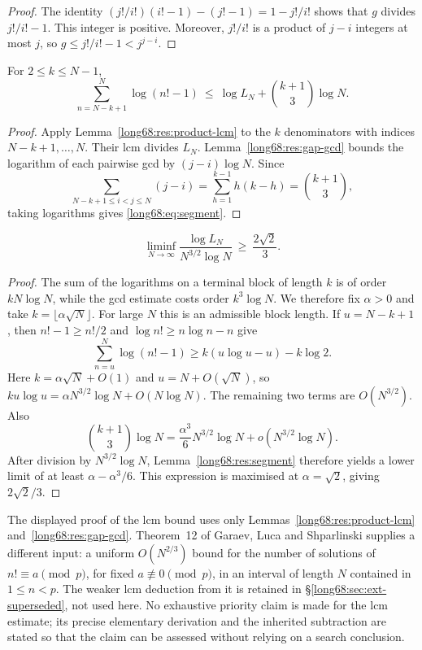\documentclass[11pt]{article}
\newcommand{\Lc}{L}
\begin{document}
\begin{proof}
The identity
$(j!/i!)(i!-1)-(j!-1)=1-j!/i!$ shows that $g$ divides $j!/i!-1$.
This integer is positive. Moreover, $j!/i!$ is a product of $j-i$ integers
at most $j$, so $g\le j!/i!-1<j^{j-i}$.
\end{proof}

\begin{lemma}\label{long68:res:segment}
For $2\le k\le N-1$,
\begin{equation}\label{long68:eq:segment}
 \sum_{n=N-k+1}^{N}\log(n!-1)
 \ \le\ \log \Lc_N+\binom{k+1}{3}\log N.
\end{equation}


\end{lemma}

\begin{proof}
Apply Lemma~\ref{long68:res:product-lcm} to the $k$ denominators with
indices $N-k+1,\ldots,N$. Their lcm divides $\Lc_N$.
Lemma~\ref{long68:res:gap-gcd} bounds the logarithm of each pairwise gcd
by $(j-i)\log N$. Since
\[
 \sum_{N-k+1\le i<j\le N}(j-i)
 =\sum_{h=1}^{k-1}h(k-h)=\binom{k+1}{3},
\]
taking logarithms gives \eqref{long68:eq:segment}.
\end{proof}

\begin{theorem}\label{long68:res:lcm-growth}
\[
 \liminf_{N\to\infty}\frac{\log \Lc_N}{N^{3/2}\log N}
 \ \ge\ \frac{2\sqrt2}{3}.
\]
\end{theorem}

\begin{proof}
The sum of the logarithms on a terminal block of length $k$ is of order
$kN\log N$, while the gcd estimate costs order $k^3\log N$.
We therefore fix $\alpha>0$ and take $k=\lfloor\alpha\sqrt N\rfloor$.
For large $N$ this is an admissible block length. If $u=N-k+1$, then
$n!-1\ge n!/2$ and $\log n!\ge n\log n-n$ give
\[
 \sum_{n=u}^N\log(n!-1)\ge k(u\log u-u)-k\log2.
\]
Here $k=\alpha\sqrt N+O(1)$ and $u=N+O(\sqrt N)$, so
$ku\log u=\alpha N^{3/2}\log N+O(N\log N)$.
The remaining two terms are $O(N^{3/2})$. Also
\[
 \binom{k+1}{3}\log N
 =\frac{\alpha^3}{6}N^{3/2}\log N+o(N^{3/2}\log N).
\]
After division by $N^{3/2}\log N$, Lemma~\ref{long68:res:segment}
therefore yields a lower limit of at least $\alpha-\alpha^3/6$.
This expression is maximised at $\alpha=\sqrt2$, giving $2\sqrt2/3$.
\end{proof}

The displayed proof of the lcm bound uses only
Lemmas~\ref{long68:res:product-lcm} and~\ref{long68:res:gap-gcd}.
Theorem~12 of Garaev, Luca and Shparlinski
\cite[arXiv v1, p.~16]{garaev-luca-shparlinski} supplies a different input:
a uniform $O(N^{2/3})$ bound for the number of solutions of
$n!\equiv a\pmod p$, for fixed $a\not\equiv0\pmod p$, in an interval of
length $N$ contained in $1\le n<p$.  The weaker lcm deduction
from it is retained in \S\ref{long68:sec:ext-superseded}, not used here.
No exhaustive priority claim is made for the lcm estimate;
its precise elementary derivation and the inherited subtraction are stated
so that the claim can be assessed without relying on a search conclusion.
\end{document}
